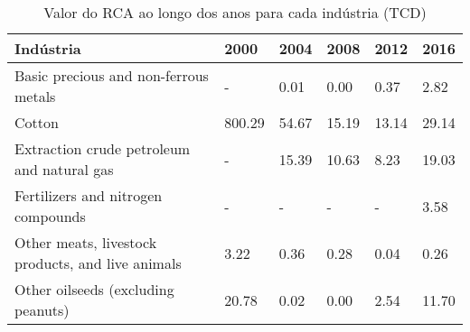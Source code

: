\begin{table}
\centering
\caption{Valor do RCA ao longo dos anos para cada indústria (TCD)}
\begin{tabular}{p{6cm}p{1.5cm}p{1.5cm}p{1.5cm}p{1.5cm}p{1.5cm}}
\toprule
                                        Indústria &   2000 &  2004 &  2008 &  2012 &  2016 \\
\midrule
            Basic precious and non-ferrous metals &      - &  0.01 &  0.00 &  0.37 &  2.82 \\
                                           Cotton & 800.29 & 54.67 & 15.19 & 13.14 & 29.14 \\
       Extraction crude petroleum and natural gas &      - & 15.39 & 10.63 &  8.23 & 19.03 \\
               Fertilizers and nitrogen compounds &      - &     - &     - &     - &  3.58 \\
Other meats, livestock products, and live animals &   3.22 &  0.36 &  0.28 &  0.04 &  0.26 \\
               Other oilseeds (excluding peanuts) &  20.78 &  0.02 &  0.00 &  2.54 & 11.70 \\
\bottomrule
\end{tabular}
\end{table}
